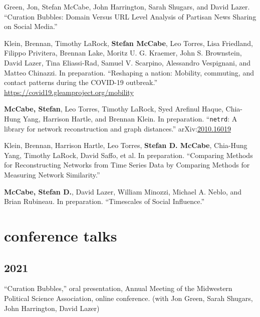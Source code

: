 \documentclass[11pt, letter]{article}
\begin{document}
\begin{hangparas}{.25in}{1}
  Green, Jon, Stefan McCabe, John Harrington, Sarah Shugars, and David Lazer.
  ``Curation Bubbles: Domain Versus URL Level Analysis of Partisan News Sharing
  on Social Media.''\vspace{2mm}

Klein, Brennan,\textsuperscript{\textdagger} Timothy
LaRock,\textsuperscript{\textdagger} \textbf{Stefan
  McCabe},\textsuperscript{\textdagger} Leo Torres,\textsuperscript{\textdagger}
Lisa Friedland, Filippo Privitera, Brennan Lake, Moritz U. G. Kraemer, John S.
Brownstein, David Lazer, Tina Eliassi-Rad, Samuel V. Scarpino, Alessandro
Vespignani, and Matteo Chinazzi. In preparation. ``Reshaping a nation: Mobility,
commuting, and contact patterns during the COVID-19 outbreak.''
\href{https://covid19.gleamproject.org/mobility}{https://covid19.gleamproject.org/mobility}
\vspace{2mm}

\textbf{McCabe, Stefan}, Leo Torres, Timothy LaRock, Syed Arefinul Haque,
Chia-Hung Yang, Harrison Hartle, and Brennan Klein. In preparation.
``\texttt{netrd}: A library for network reconstruction and graph distances.''
arXiv:\href{https://arxiv.org/abs/2010.16019}{2010.16019}\vspace{2mm}

Klein, Brennan, Harrison Hartle, Leo Torres, \textbf{Stefan D. McCabe},
Chia-Hung Yang, Timothy LaRock, David Saffo, et al. In preparation. ``Comparing
Methods for Reconstructing Networks from Time Series Data by Comparing Methods
for Measuring Network Similarity.''\vspace{2mm}

\textbf{McCabe, Stefan D.}, David Lazer, William Minozzi, Michael A. Neblo, and
Brian Rubineau. In preparation. ``Timescales of Social Influence.''\vspace{2mm}
\vspace{2mm}

\end{hangparas}
\section{conference talks}

\subsection{2021}

\begin{hangparas}{.25in}{1}
  ``Curation Bubbles,'' oral presentation, Annual Meeting of the Midwestern
  Political Science Association, online conference. (with Jon Green, Sarah
  Shugars, John Harrington, David Lazer)

\end{hangparas}
\end{document}
